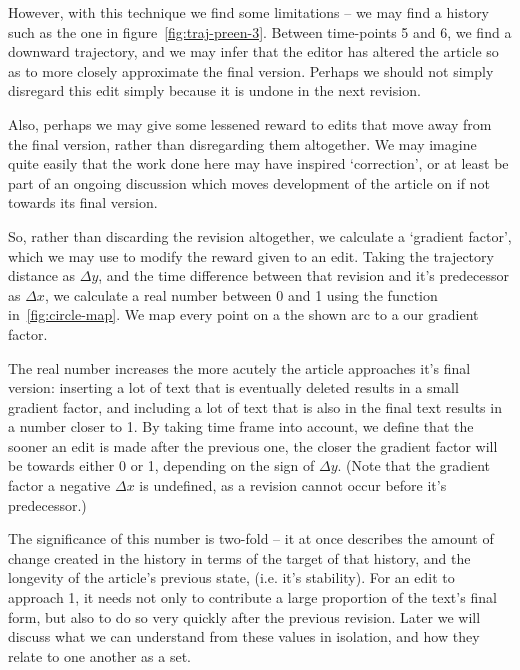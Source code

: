 However, with this technique we find some limitations -- we may find a
history such as the one in figure~\ref{fig:traj-preen-3}. Between
time-points 5 and 6, we find a downward trajectory, and we may infer
that the editor has altered the article so as to more closely
approximate the final version. Perhaps we should not simply disregard
this edit simply because it is undone in the next revision.

Also, perhaps we may give some lessened reward to edits that move away
from the final version, rather than disregarding them altogether. We
may imagine quite easily that the work done here may have inspired
`correction', or at least be part of an ongoing discussion which moves
development of the article on if not towards its final version.

So, rather than discarding the revision altogether, we calculate a
`gradient factor', which we may use to modify the reward given to an
edit. Taking the trajectory distance as $\Delta y$, and the time
difference between that revision and it's predecessor as $\Delta x$,
we calculate a real number between 0 and 1 using the function
in~\ref{fig:circle-map}. We map every point on a the shown arc to a
our gradient factor. 

The real number increases the more acutely the article approaches it's
final version: inserting a lot of text that is eventually deleted
results in a small gradient factor, and including a lot of text that
is also in the final text results in a number closer to 1. By taking
time frame into account, we define that the sooner an edit is made
after the previous one, the closer the gradient factor will be towards
either 0 or 1, depending on the sign of $\Delta y$. (Note that the
gradient factor a negative $\Delta x$ is undefined, as a revision
cannot occur before it's predecessor.)



The significance of this number is two-fold -- it at once describes
the amount of change created in the history in terms of the target of
that history, and the longevity of the article's previous state,
(i.e. it's stability). For an edit to approach 1, it needs not only to
contribute a large proportion of the text's final form, but also to do
so very quickly after the previous revision. Later we will discuss
what we can understand from these values in isolation, and how they
relate to one another as a set. 

